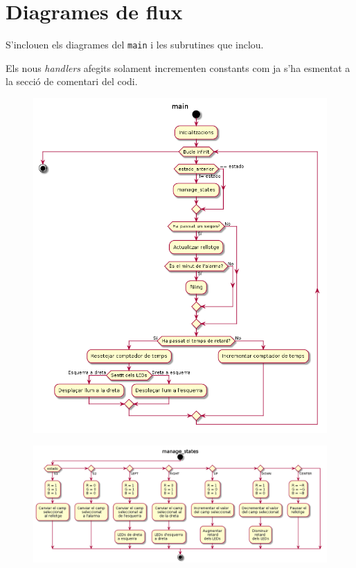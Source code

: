 \documentclass{../pdae} %
\begin{document}

\section{Diagrames de flux}

S'inclouen els diagrames del \texttt{main} i les subrutines que inclou.

Els nous \textit{handlers} afegits solament incrementen constants com ja s'ha
esmentat a la secció de comentari del codi.

\begin{figure}[H]
  \centering
  \includegraphics[scale=.45]{main}
\end{figure}

\begin{figure}[H]
  \centering
  \includegraphics[scale=.4]{manage_states}
\end{figure}
\end{document}
